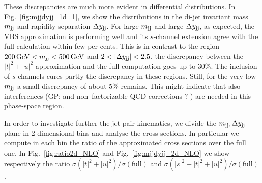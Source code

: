 These discrepancies are much more evident in differential distributions.
In Fig.~\ref{fig:mjjdyjj_1d_1}, we show the distributions in the di-jet invariant mass $m_{\text{j}\text{j}}$ and rapidity separation $\Delta y_{\text{j}\text{j}}$.
For large $m_{\text{j}\text{j}}$ and large $\Delta y_{\text{j}\text{j}}$, as expected, the VBS approximation is performing well and its $s$-channel extension agree with the full calculation within few per cents.
This is in contrast to the region  $200 \,\text{GeV} < m_{\text{j}\text{j}} < 500 \,\text{GeV}$ and $2<|\Delta y_{\Pj\Pj}|<2.5$, the discrepancy between the $|t|^2 + |u|^2$ approximation and the full computation goes up to $30\%$.
The inclusion of $s$-channels cures partly the discrepancy in these regions.
Still, for the very low $m_{\text{j}\text{j}}$ a small discrepancy of about $5\%$ remains.
This might indicate that also interferences (GP: and non--factorizable QCD corrections ? ) are needed in this phase-space region.

In order to investigate further the jet pair kinematics, we divide the $m_{\text{j}\text{j}},\Delta y_{\text{j}\text{j}}$ plane in 2-dimensional bins and analyse the cross sections.
In particular we compute in each bin the ratio of the approximated cross sections over the full one.
In Fig.~\ref{fig:ratio2d_NLO} and Fig.~\ref{fig:mjjdyjj_2d_NLO} we show respectively the ratio $\sigma(|t|^2 + |u|^2)/\sigma(\textrm{full})$ and $\sigma(|s|^2+|t|^2 + |u|^2)/\sigma(\textrm{full})$.


